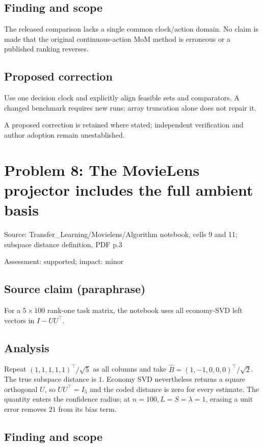 \documentclass[11pt]{article}
\begin{document}
\subsection*{Finding and scope}

The released comparison lacks a single common clock/action domain. No claim is made that the original continuous-action MoM method is erroneous or a published ranking reverses.

\subsection*{Proposed correction}

Use one decision clock and explicitly align feasible sets and comparators. A changed benchmark requires new runs; array truncation alone does not repair it.

A proposed correction is retained where stated; independent verification and author adoption remain unestablished.

\section*{Problem 8: The MovieLens projector includes the full ambient basis}

Source: Transfer\_Learning/Movielens/Algorithm notebook, cells 9 and 11; subspace distance definition, PDF p.3

Assessment: supported; impact: minor

\subsection*{Source claim (paraphrase)}

For a \(5\times100\) rank-one task matrix, the notebook uses all economy-SVD left vectors in \(I-UU^\top\).

\subsection*{Analysis}

Repeat \((1,1,1,1,1)^\top/\sqrt5\) as all columns and take \(\widehat B=(1,-1,0,0,0)^\top/\sqrt2\). The true subspace distance is \(1\). Economy SVD nevertheless returns a square orthogonal \(U\), so \(UU^\top=I_5\) and the coded distance is zero for every estimate. The quantity enters the confidence radius; at \(n=100,L=S=\lambda=1\), erasing a unit error removes \(21\) from its bias term.

\subsection*{Finding and scope}
\end{document}
